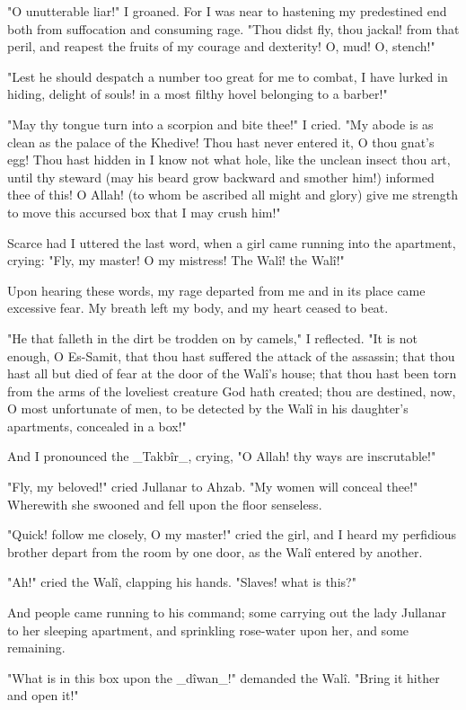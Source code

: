 "O unutterable liar!" I groaned. For I was near to hastening my
predestined end both from suffocation and consuming rage. "Thou didst
fly, thou jackal! from that peril, and reapest the fruits of my
courage and dexterity! O, mud! O, stench!"

"Lest he should despatch a number too great for me to combat, I have
lurked in hiding, delight of souls! in a most filthy hovel belonging
to a barber!"

"May thy tongue turn into a scorpion and bite thee!" I cried. "My
abode is as clean as the palace of the Khedive! Thou hast never
entered it, O thou gnat's egg! Thou hast hidden in I know not what
hole, like the unclean insect thou art, until thy steward (may his
beard grow backward and smother him!) informed thee of this! O Allah!
(to whom be ascribed all might and glory) give me strength to move
this accursed box that I may crush him!"

Scarce had I uttered the last word, when a girl came running into the
apartment, crying: "Fly, my master! O my mistress! The Walî! the
Walî!"

Upon hearing these words, my rage departed from me and in its place
came excessive fear. My breath left my body, and my heart ceased to
beat.

"He that falleth in the dirt be trodden on by camels," I reflected.
"It is not enough, O Es-Samit, that thou hast suffered the attack of
the assassin; that thou hast all but died of fear at the door of the
Walî's house; that thou hast been torn from the arms of the loveliest
creature God hath created; thou are destined, now, O most unfortunate
of men, to be detected by the Walî in his daughter's apartments,
concealed in a box!"

And I pronounced the _Takbîr_, crying, "O Allah! thy ways are
inscrutable!"

"Fly, my beloved!" cried Jullanar to Ahzab. "My women will conceal
thee!" Wherewith she swooned and fell upon the floor senseless.

"Quick! follow me closely, O my master!" cried the girl, and I heard
my perfidious brother depart from the room by one door, as the Walî
entered by another.

"Ah!" cried the Walî, clapping his hands. "Slaves! what is this?"

And people came running to his command; some carrying out the lady
Jullanar to her sleeping apartment, and sprinkling rose-water upon
her, and some remaining.

"What is in this box upon the _dîwan_!" demanded the Walî. "Bring it
hither and open it!"

